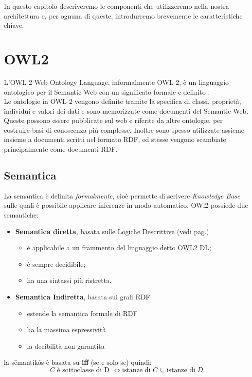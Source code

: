 In questo capitolo descriveremo le componenti che utilizzeremo nella nostra
architettura e, per ognuna di queste, introdurremo brevemente le caratteristiche chiave.
\section{OWL2}

L'OWL 2 Web Ontology Language, informalmente OWL 2, è un linguaggio ontologico per il Semantic Web con un significato formale e definito \cite{OWl2Primer}.\\
Le ontologie in OWL 2 vengono definite tramite la specifica di classi, proprietà, individui e valori dei dati e sono memorizzate come documenti del Semantic Web.
Queste possono essere pubblicate sul web e riferite da altre ontologie, per costruire basi di conoscenza più complesse. 
Inoltre sono spesso utilizzate assieme insieme a documenti scritti nel formato RDF, ed stesse vengono scambiate principalmente come documenti RDF.

\subsection{Semantica}
La semantica è definita \textit{formalmente}, cioè permette di scrivere \textit{Knowledge Base} sulle quali è possibile applicare inferenze in modo automatico.
OWl2 possiede due semantiche:
\begin{itemize}
	\item[] \textbf{Semantica diretta}, basata sulle Logiche Descrittive (vedi pag.\pageref{chap: DL})
		\begin{itemize}
			\item è applicabile a un frammento del linguaggio detto OWL2 DL;
			\item è sempre decidibile;
			\item ha una sintassi più ristretta. 
		\end{itemize}
	\item[] \textbf{Semantica Indiretta}, basata sui grafi RDF
		\begin{itemize}
			\item estende la semantica formale di RDF
			\item ha la massima espressività 
			\item la decibilità non garantita
		\end{itemize}
\end{itemize}
la sēmantikós è basata su \textbf{iff} (se e solo se) quindi:
\[ C \text{ è sottoclasse di D } \iff  \text{istanze di } C \subseteq \text{istanze di } D \]

